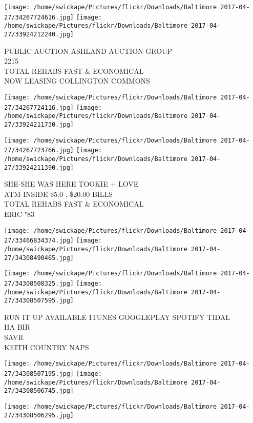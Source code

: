 \documentclass[10pt,letterpaper]{article}
\begin{document}
\texttt{[image: /home/swickape/Pictures/flickr/Downloads/Baltimore 2017-04-27/34267724616.jpg]}
\texttt{[image: /home/swickape/Pictures/flickr/Downloads/Baltimore 2017-04-27/33924212240.jpg]}

PUBLIC AUCTION ASHLAND AUCTION GROUP\\
2215\\
TOTAL REHABS FAST \& ECONOMICAL\\
NOW LEASING COLLINGTON COMMONS
\pagebreak

\texttt{[image: /home/swickape/Pictures/flickr/Downloads/Baltimore 2017-04-27/34267724116.jpg]}
\texttt{[image: /home/swickape/Pictures/flickr/Downloads/Baltimore 2017-04-27/33924211730.jpg]}

\texttt{[image: /home/swickape/Pictures/flickr/Downloads/Baltimore 2017-04-27/34267723766.jpg]}
\texttt{[image: /home/swickape/Pictures/flickr/Downloads/Baltimore 2017-04-27/33924211390.jpg]}

SHE{-}SHE WAS HERE TOOKIE + LOVE\\
ATM INSIDE \$5.0 , \$20.00 BILLS\\
TOTAL REHABS FAST \& ECONOMICAL\\
ERIC "83
\pagebreak

\texttt{[image: /home/swickape/Pictures/flickr/Downloads/Baltimore 2017-04-27/33466834374.jpg]}
\texttt{[image: /home/swickape/Pictures/flickr/Downloads/Baltimore 2017-04-27/34308490465.jpg]}

\texttt{[image: /home/swickape/Pictures/flickr/Downloads/Baltimore 2017-04-27/34308508325.jpg]}
\texttt{[image: /home/swickape/Pictures/flickr/Downloads/Baltimore 2017-04-27/34308507595.jpg]}

RUN IT UP AVAILABLE ITUNES GOOGLEPLAY SPOTIFY TIDAL\\
HA BIR\\
SAVR\\
KEITH COUNTRY NAPS
\pagebreak

\texttt{[image: /home/swickape/Pictures/flickr/Downloads/Baltimore 2017-04-27/34308507195.jpg]}
\texttt{[image: /home/swickape/Pictures/flickr/Downloads/Baltimore 2017-04-27/34308506745.jpg]}

\vspace{0.25in}
\texttt{[image: /home/swickape/Pictures/flickr/Downloads/Baltimore 2017-04-27/34308506295.jpg]}
\end{document}

